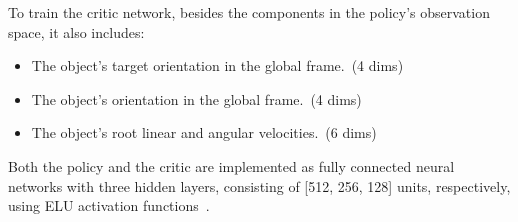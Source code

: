 To train the critic network, besides the components in the policy's observation space, it also includes:

\begin{itemize}
    \item The object's target orientation in the global frame.~(4 dims)
    \item The object's orientation in the global frame.~(4 dims)
    \item The object's root linear and angular velocities.~(6 dims)
\end{itemize}


Both the policy and the critic are implemented as fully connected neural networks with three hidden layers, consisting of [512, 256, 128] units, respectively, using ELU activation functions~\citep{ELUs}. 




